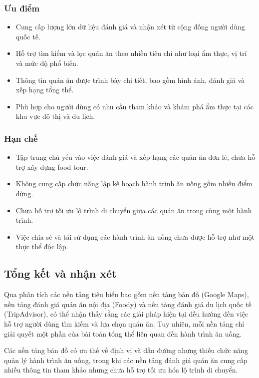 \subsubsection{Ưu điểm}
\begin{itemize}[label=\textbullet]
    \item Cung cấp lượng lớn dữ liệu đánh giá và nhận xét từ cộng đồng người dùng quốc tế.
    \item Hỗ trợ tìm kiếm và lọc quán ăn theo nhiều tiêu chí như loại ẩm thực, vị trí và mức độ phổ biến.
    \item Thông tin quán ăn được trình bày chi tiết, bao gồm hình ảnh, đánh giá và xếp hạng tổng thể.
    \item Phù hợp cho người dùng có nhu cầu tham khảo và khám phá ẩm thực tại các khu vực đô thị và du lịch.
\end{itemize}

\subsubsection{Hạn chế}
\begin{itemize}[label=\textbullet]
    \item Tập trung chủ yếu vào việc đánh giá và xếp hạng các quán ăn đơn lẻ, chưa hỗ trợ xây dựng food tour.
    \item Không cung cấp chức năng lập kế hoạch hành trình ăn uống gồm nhiều điểm dừng.
    \item Chưa hỗ trợ tối ưu lộ trình di chuyển giữa các quán ăn trong cùng một hành trình.
    \item Việc chia sẻ và tái sử dụng các hành trình ăn uống chưa được hỗ trợ như một thực thể độc lập.
\end{itemize}

\subsection{Tổng kết và nhận xét}
Qua phân tích các nền tảng tiêu biểu bao gồm nền tảng bản đồ (Google Maps), nền tảng đánh giá quán ăn nội địa (Foody) và nền tảng đánh giá du lịch quốc tế (TripAdvisor), có thể nhận thấy rằng các giải pháp hiện tại đều hướng đến việc hỗ trợ người dùng tìm kiếm và lựa chọn quán ăn. Tuy nhiên, mỗi nền tảng chỉ giải quyết một phần của bài toán tổng thể liên quan đến hành trình ăn uống.

Các nền tảng bản đồ có ưu thế về định vị và dẫn đường nhưng thiếu chức năng quản
lý hành trình ăn uống, trong khi các nền tảng đánh giá quán ăn cung cấp nhiều thông tin tham khảo nhưng chưa hỗ trợ tối ưu hóa lộ trình di chuyển.

